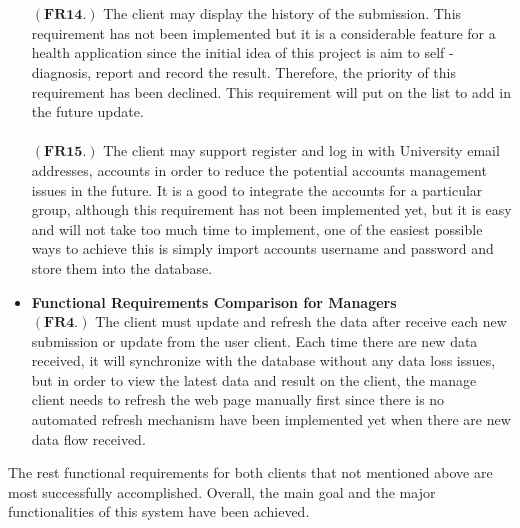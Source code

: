\documentclass[12pt]{article}
\begin{document}
\begin{itemize}
\\
\\$\mathbf{(FR14.)}$ The client may display the history of the submission. This requirement has not been implemented but it is a considerable feature for a health application since the initial idea of this project is aim to self -diagnosis, report and record the result. Therefore, the priority of this requirement has been declined. This requirement will put on the list to add in the future update.
\\
\\$\mathbf{(FR15.)}$ The client may support register and log in with University email addresses, accounts in order to reduce the potential accounts management issues in the future. It is a good to integrate the accounts for a particular group, although this requirement has not been implemented yet, but it is easy and will not take too much time to implement, one of the easiest possible ways to achieve this is simply import accounts username and password and store them into the database.
\item\textbf{Functional Requirements Comparison for Managers}
\\$\mathbf{(FR4.)}$ The client must update and refresh the data after receive each new submission or update from the user client. Each time there are new data received, it will synchronize with the database without any data loss issues, but in order to view the latest data and result on the client, the manage client needs to refresh the web page manually first since there is no automated refresh mechanism have been implemented yet when there are new data flow received.
\end{itemize}
The rest functional requirements for both clients that not mentioned above are most successfully accomplished. Overall, the main goal and the major functionalities of this system have been achieved. 
\end{document}
